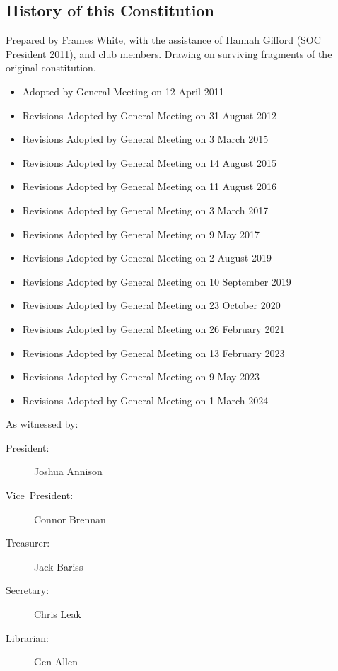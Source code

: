 \documentclass[a4paper]{article}
\begin{document}
\begin{appendices}

    \section{History of this Constitution} \label{sec:app:history}

    \noindent Prepared by Frames White, with the assistance of Hannah Gifford (SOC President 2011), and club members. Drawing on surviving fragments of the original constitution.

    \medskip{}

    \begin{itemize}[label={}]
        \item Adopted by General Meeting on 12 April 2011
        \item Revisions Adopted by General Meeting on 31 August 2012
        \item Revisions Adopted by General Meeting on 3 March 2015
        \item Revisions Adopted by General Meeting on 14 August 2015
        \item Revisions Adopted by General Meeting on 11 August 2016
        \item Revisions Adopted by General Meeting on 3 March 2017
        \item Revisions Adopted by General Meeting on 9 May 2017
        \item Revisions Adopted by General Meeting on 2 August 2019
        \item Revisions Adopted by General Meeting on 10 September 2019
        \item Revisions Adopted by General Meeting on 23 October 2020
        \item Revisions Adopted by General Meeting on 26 February 2021
        \item Revisions Adopted by General Meeting on 13 February 2023
        \item Revisions Adopted by General Meeting on 9 May 2023
        \item Revisions Adopted by General Meeting on 1 March 2024
    \end{itemize}

    \medskip{}

    \noindent As witnessed by:
    \begin{description}
        \item[{President:}] Joshua Annison
        \item[{Vice~President:}] Connor Brennan
        \item[{Treasurer:}] Jack Bariss
        \item[{Secretary:}] Chris Leak
        \item[{Librarian:}] Gen Allen
    \end{description}

\end{appendices}
\end{document}

